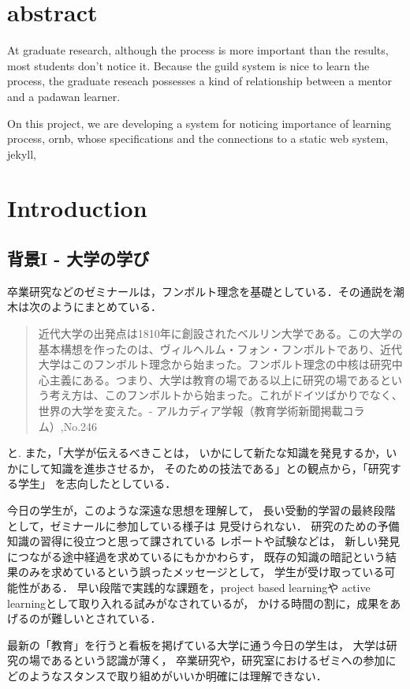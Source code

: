 \documentclass[a4,p11]{article}
\author{bob}
\date{}
\title{}
\begin{document}
\section{abstract}
\label{sec:orgc3fff19}
At graduate research, 
although the process is more important than the results,
most students don't notice it.
Because the guild system is nice to learn the process,
the graduate reseach possesses a kind of
relationship between 
a mentor and a padawan learner.

On this project, 
we are developing a system for
noticing importance of learning process,
ornb, whose specifications and 
the connections to a static web system, jekyll,


\section{Introduction}
\label{sec:orgd0fe107}
\subsection{背景I - 大学の学び}
\label{sec:org6375fd6}
卒業研究などのゼミナールは，フンボルト理念を基礎としている．その通説を潮木は次のようにまとめている．
\begin{quote}
近代大学の出発点は1810年に創設されたベルリン大学である。この大学の基本構想を作ったのは、ヴィルヘルム・フォン・フンボルトであり、近代大学はこのフンボルト理念から始まった。フンボルト理念の中核は研究中心主義にある。つまり、大学は教育の場である以上に研究の場であるという考え方は、このフンボルトから始まった。これがドイツばかりでなく、世界の大学を変えた。- アルカディア学報（教育学術新聞掲載コラム）,No.246
\end{quote}
と. また，「大学が伝えるべきことは，
いかにして新たな知識を発見するか，いかにして知識を進歩させるか，
そのための技法である」との観点から，「研究する学生」
を志向したとしている．

今日の学生が，このような深遠な思想を理解して，
長い受動的学習の最終段階として，ゼミナールに参加している様子は
見受けられない．
研究のための予備知識の習得に役立つと思って課されている
レポートや試験などは，
新しい発見につながる途中経過を求めているにもかかわらす，
既存の知識の暗記という結果のみを求めているという誤ったメッセージとして，
学生が受け取っている可能性がある．
早い段階で実践的な課題を，project based learningや
active learningとして取り入れる試みがなされているが，
かける時間の割に，成果をあげるのが難しいとされている．

最新の「教育」を行うと看板を掲げている大学に通う今日の学生は，
大学は研究の場であるという認識が薄く，
卒業研究や，研究室におけるゼミへの参加に
どのようなスタンスで取り組めがいいか明確には理解できない．
\end{document}
